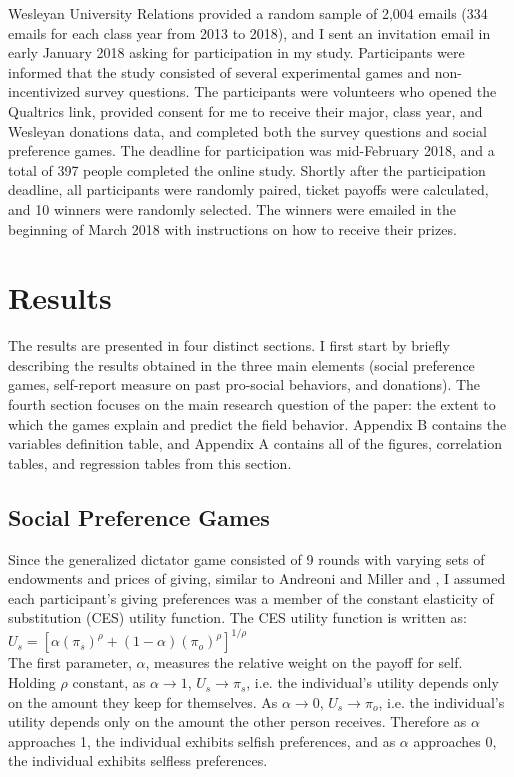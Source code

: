 \documentclass[12pt]{article}
\begin{document}
Wesleyan University Relations provided a random sample of 2,004 emails (334 emails for each class year from 2013 to 2018), and I sent an invitation email in early January 2018 asking for participation in my study. Participants were informed that the study consisted of several experimental games and non-incentivized survey questions. The participants were volunteers who opened the Qualtrics link, provided consent for me to receive their major, class year, and Wesleyan donations data, and completed both the survey questions and social preference games. The deadline for participation was mid-February 2018, and a total of 397 people completed the online study. Shortly after the participation deadline, all participants were randomly paired, ticket payoffs were calculated, and 10 winners were randomly selected. The winners were emailed  in the beginning of March 2018 with instructions on how to receive their prizes.

\section{Results}
The results are presented in four distinct sections. I first start by briefly describing the results obtained in the three main elements (social preference games, self-report measure on past pro-social behaviors, and donations). The fourth section focuses on the main research question of the paper: the extent to which the games explain and predict the field behavior. Appendix B contains the variables definition table, and Appendix A contains all of the figures, correlation tables, and regression tables from this section.

\subsection{Social Preference Games}
Since the generalized dictator game consisted of 9 rounds with varying sets of endowments and prices of giving, similar to Andreoni and Miller and \cite{fisman_kariv_markovits_2007}, I assumed each participant\rq s giving preferences was a member of the constant elasticity of substitution (CES) utility function.  The CES utility function is written as:\\


\(U_{s} = [\alpha(\pi_{s})^{\rho} + (1-\alpha)(\pi_{o})^{\rho}]^{1/\rho}\) \\


The first parameter, \(\alpha\), measures the relative weight on the payoff for self. Holding \(\rho\) constant, as \(\alpha \rightarrow 1\), \(U_{s} \rightarrow \pi_{s}\), i.e. the individual\rq s utility depends only on the amount they keep for themselves. As \(\alpha \rightarrow 0\), \(U_{s} \rightarrow \pi_{o}\), i.e. the individual\rq s utility depends only on the amount the other person receives. Therefore as \(\alpha\) approaches 1, the individual exhibits selfish preferences, and as \(\alpha\) approaches 0, the individual exhibits selfless preferences.
\end{document}
